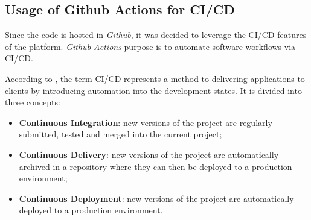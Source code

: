 




\subsection{Usage of Github Actions for CI/CD}
\label{subsec:implementation:decisions:actions}

Since the code is hosted in \textit{Github}, it was decided to leverage the CI/CD features of the platform. \textit{Github Actions} purpose is to automate software workflows via CI/CD.

According to \cite{cicd}, the term CI/CD represents a method to delivering applications to clients by introducing automation into the development states.
It is divided into three concepts:

\begin{itemize}
    \item \textbf{Continuous Integration}: new versions of the project are regularly submitted, tested and merged into the current project;
    \item \textbf{Continuous Delivery}: new versions of the project are automatically archived in a repository where they can then be deployed to a production environment;
    \item \textbf{Continuous Deployment}: new versions of the project are automatically deployed to a production environment.
\end{itemize}

